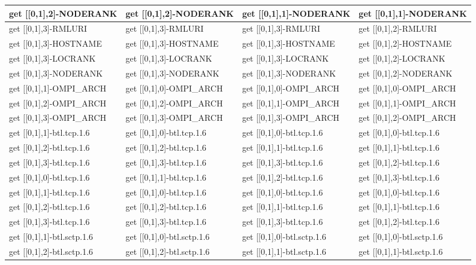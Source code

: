 \begin{table}
\begin{tabular}{|p{4cm}|p{4cm}|p{4cm}|p{4cm}|}
get [[0,1],2]-NODERANK
 &  get [[0,1],2]-NODERANK
 &  get [[0,1],1]-NODERANK
 &  get [[0,1],1]-NODERANK\\
\hline
get [[0,1],3]-RMLURI
 &  get [[0,1],3]-RMLURI
 &  get [[0,1],3]-RMLURI
 &  get [[0,1],2]-RMLURI\\
get [[0,1],3]-HOSTNAME
 &  get [[0,1],3]-HOSTNAME
 &  get [[0,1],3]-HOSTNAME
 &  get [[0,1],2]-HOSTNAME\\
get [[0,1],3]-LOCRANK
 &  get [[0,1],3]-LOCRANK
 &  get [[0,1],3]-LOCRANK
 &  get [[0,1],2]-LOCRANK\\
get [[0,1],3]-NODERANK
 &  get [[0,1],3]-NODERANK
 &  get [[0,1],3]-NODERANK
 &  get [[0,1],2]-NODERANK\\
\hline
get [[0,1],1]-OMPI\_ARCH
 &  get [[0,1],0]-OMPI\_ARCH
 &  get [[0,1],0]-OMPI\_ARCH
 &  get [[0,1],0]-OMPI\_ARCH\\
get [[0,1],2]-OMPI\_ARCH
 &  get [[0,1],2]-OMPI\_ARCH
 &  get [[0,1],1]-OMPI\_ARCH
 &  get [[0,1],1]-OMPI\_ARCH\\
get [[0,1],3]-OMPI\_ARCH
 &  get [[0,1],3]-OMPI\_ARCH
 &  get [[0,1],3]-OMPI\_ARCH
 &  get [[0,1],2]-OMPI\_ARCH\\
\hline
get [[0,1],1]-btl.tcp.1.6
 &  get [[0,1],0]-btl.tcp.1.6
 &  get [[0,1],0]-btl.tcp.1.6
 &  get [[0,1],0]-btl.tcp.1.6\\
get [[0,1],2]-btl.tcp.1.6
 &  get [[0,1],2]-btl.tcp.1.6
 &  get [[0,1],1]-btl.tcp.1.6
 &  get [[0,1],1]-btl.tcp.1.6\\
get [[0,1],3]-btl.tcp.1.6
 &  get [[0,1],3]-btl.tcp.1.6
 &  get [[0,1],3]-btl.tcp.1.6
 &  get [[0,1],2]-btl.tcp.1.6\\
\hline
get [[0,1],0]-btl.tcp.1.6
 &  get [[0,1],1]-btl.tcp.1.6
 &  get [[0,1],2]-btl.tcp.1.6
 &  get [[0,1],3]-btl.tcp.1.6\\
get [[0,1],1]-btl.tcp.1.6
 &  get [[0,1],0]-btl.tcp.1.6
 &  get [[0,1],0]-btl.tcp.1.6
 &  get [[0,1],0]-btl.tcp.1.6\\
get [[0,1],2]-btl.tcp.1.6
 &  get [[0,1],2]-btl.tcp.1.6
 &  get [[0,1],1]-btl.tcp.1.6
 &  get [[0,1],1]-btl.tcp.1.6\\
get [[0,1],3]-btl.tcp.1.6
 &  get [[0,1],3]-btl.tcp.1.6
 &  get [[0,1],3]-btl.tcp.1.6
 &  get [[0,1],2]-btl.tcp.1.6\\
\hline
get [[0,1],1]-btl.sctp.1.6
 &  get [[0,1],0]-btl.sctp.1.6
 &  get [[0,1],0]-btl.sctp.1.6
 &  get [[0,1],0]-btl.sctp.1.6\\
get [[0,1],2]-btl.sctp.1.6
 &  get [[0,1],2]-btl.sctp.1.6
 &  get [[0,1],1]-btl.sctp.1.6
 &  get [[0,1],1]-btl.sctp.1.6\\

\end{tabular}
\end{table}
